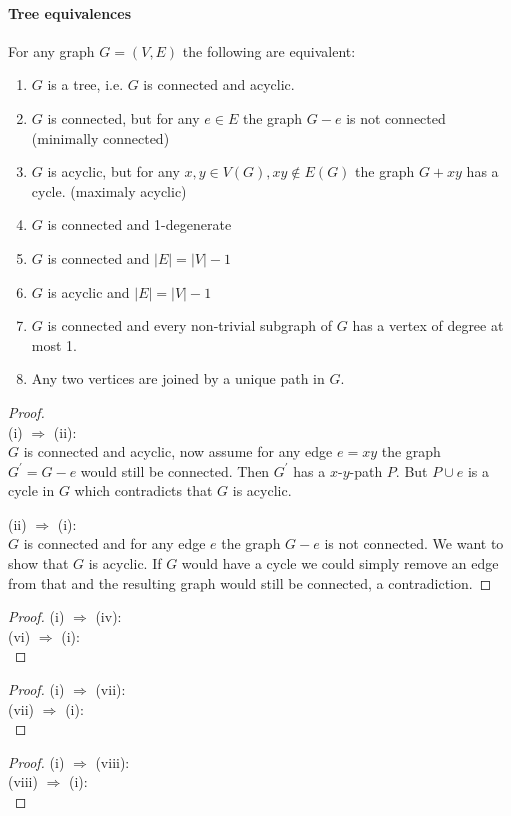 \paragraph{Tree equivalences} For any graph $ G = (V,E) $ the following are equivalent:
\begin{enumerate}
    \item $G $ is a tree, i.e. $ G $ is connected and acyclic.
    \item $G $ is connected, but for any $ e \in E $ the graph $ G - e $ is not 
    connected (minimally connected)
    \item $G $ is acyclic, but for any $ x,y \in V(G), xy \notin E(G) $ the graph 
    $ G + xy $ has a cycle. (maximaly acyclic) 
    \item $G $ is connected and 1-degenerate
    \item $G $ is connected and $ |E| = |V| - 1 $
    \item $G $ is acyclic and $ |E| = |V| - 1 $
    \item $G $ is connected and every non-trivial subgraph of $ G $ has a vertex of 
    degree at most 1.
    \item Any two vertices are joined by a unique path in $ G $.
\end{enumerate}
\begin{proof} $ $ \\
    (i) $ \Rightarrow $ (ii): \\
    $ G $ is connected and acyclic, now assume for any edge $ e = xy $ the graph
    $ G^\prime = G - e $ would still be connected. Then $ G^\prime $ has a 
    $x$-$y$-path $ P $. But $ P \cup {e} $ is a cycle in $ G $ which contradicts
    that $ G $ is acyclic.

    \smallskip
    \noindent(ii) $ \Rightarrow $ (i): \\
    $ G $ is connected and for any edge $ e $ the graph $ G - e $ is not connected.
    We want to show that $ G $ is acyclic. If $ G $ would have a cycle we could simply
    remove an edge from that and the resulting graph would still be connected, 
    a contradiction.
\end{proof}
\begin{proof}
    (i) $ \Rightarrow $ (iv): \\


    \smallskip
    \noindent(vi) $ \Rightarrow $ (i): \\
\end{proof}
\begin{proof}
    (i) $ \Rightarrow $ (vii): \\

    \smallskip
    \noindent(vii) $ \Rightarrow $ (i): \\
\end{proof}
\begin{proof}
    (i) $ \Rightarrow $ (viii): \\

    \smallskip
    \noindent(viii) $ \Rightarrow $ (i): \\
\end{proof}


